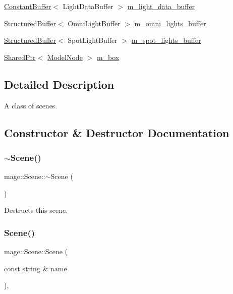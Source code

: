 \begin{DoxyCompactItemize}
\hyperlink{structmage_1_1_constant_buffer}{Constant\+Buffer}$<$ Light\+Data\+Buffer $>$ \hyperlink{classmage_1_1_scene_aa74ca1637e0a88546135d64bf3614f29}{m\+\_\+light\+\_\+data\+\_\+buffer}
\item 
\hyperlink{structmage_1_1_structured_buffer}{Structured\+Buffer}$<$ Omni\+Light\+Buffer $>$ \hyperlink{classmage_1_1_scene_a274ed5e548431ba805513a86a00bbaf1}{m\+\_\+omni\+\_\+lights\+\_\+buffer}
\item 
\hyperlink{structmage_1_1_structured_buffer}{Structured\+Buffer}$<$ Spot\+Light\+Buffer $>$ \hyperlink{classmage_1_1_scene_a64118c052d728ac988031898fd2d757d}{m\+\_\+spot\+\_\+lights\+\_\+buffer}
\item 
\hyperlink{namespacemage_a1e01ae66713838a7a67d30e44c67703e}{Shared\+Ptr}$<$ \hyperlink{classmage_1_1_model_node}{Model\+Node} $>$ \hyperlink{classmage_1_1_scene_ae60b598353c6c5b33947a6bb9e822a23}{m\+\_\+box}
\end{DoxyCompactItemize}


\subsection{Detailed Description}
A class of scenes. 

\subsection{Constructor \& Destructor Documentation}
\hypertarget{classmage_1_1_scene_adc40910fdca62586659c2961fe7e7f3c}{}\label{classmage_1_1_scene_adc40910fdca62586659c2961fe7e7f3c} 
\subsubsection{\texorpdfstring{$\sim$\+Scene()}{~Scene()}}
{\footnotesize\ttfamily mage\+::\+Scene\+::$\sim$\+Scene (\begin{DoxyParamCaption}{ }\end{DoxyParamCaption})\hspace{0.3cm}{\ttfamily [virtual]}}

Destructs this scene. \hypertarget{classmage_1_1_scene_aab61b38547fc53aa9c5b3b559f4d2e26}{}\label{classmage_1_1_scene_aab61b38547fc53aa9c5b3b559f4d2e26} 
\subsubsection{\texorpdfstring{Scene()}{Scene()}\hspace{0.1cm}{\footnotesize\ttfamily [1/3]}}
{\footnotesize\ttfamily mage\+::\+Scene\+::\+Scene (\begin{DoxyParamCaption}\item[{const string \&}]{name }\end{DoxyParamCaption})\hspace{0.3cm}{\ttfamily [explicit]}, {\ttfamily [protected]}}

